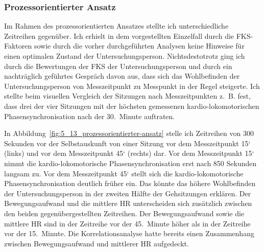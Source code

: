 \subsubsection{Prozessorientierter Ansatz}

\begin{sidewaysfigure}
	\resizebox{1.00\textwidth}{!}{%
		
		}%
	\caption[Prozessdarstellung im Verlauf des Gehens (Fallstudie: Gehen)]{Prozessdarstellung im Verlauf des Gehens -- Drei Minuten Daten aus einem Gang vor der 15 Minute (links) und einem Gang vor der 45 Minute (rechts). Quelle: Eigene Darstellung \\ \hspace{\textwidth}\emph{Anmerkung}: Bew. = Bewegungsaufwand \\ \hspace{\textwidth}Rel. Phase = Relative Phase}
	\label{fig:5_13_prozessorientierter-ansatz}
\end{sidewaysfigure}

Im Rahmen des prozessorientierten Ansatzes stellte ich unterschiedliche Zeitreihen gegenüber. Ich erhielt in dem vorgestellten Einzelfall durch die \ac{FKS}-Faktoren sowie durch die vorher durchgeführten Analysen keine Hinweise für einen optimalen Zustand der Untersuchungsperson. Nichtsdestotrotz ging ich durch die Bewertungen der \ac{FKS} der Untersuchungsperson und durch ein nachträglich geführtes Gespräch davon aus, dass sich das Wohlbefinden der Untersuchungsperson von Messzeitpunkt zu Messpunkt in der Regel steigerte. Ich stellte beim visuellen Vergleich der Sitzungen nach Messzeitpunkten z.~B. fest, dass drei der vier Sitzungen mit der höchsten gemessenen kardio-lokomotorischen Phasensynchronisation nach der 30.~Minute auftraten.

In Abbildung~\ref{fig:5_13_prozessorientierter-ansatz} stelle ich Zeitreihen von 300 Sekunden vor der Selbstauskunft von einer Sitzung vor dem Messzeitpunkt 15‘ (links) und vor dem Messzeitpunkt 45‘ (rechts) dar. Vor dem Messzeitpunkt 15‘ nimmt die kardio-lokomotorische Phasensynchronisation erst nach 850 Sekunden langsam zu. Vor dem Messzeitpunkt 45‘ stellt sich die kardio-lokomotorische Phasensynchronisation deutlich früher ein. Das könnte das höhere Wohlbefinden der Untersuchungsperson in der zweiten Hälfte der Gehsitzungen erklären. Der Bewegungsaufwand und die mittlere \ac{HR} unterscheiden sich zusätzlich zwischen den beiden gegenübergestellten Zeitreihen. Der Bewegungsaufwand sowie die mittlere \ac{HR} sind in der Zeitreihe vor der 45.~Minute höher als in der Zeitreihe vor der 15.~Minute. Die Korrelationsanalyse hatte bereits einen Zusammenhang zwischen Bewegungsaufwand und mittlerer \ac{HR} aufgedeckt.

